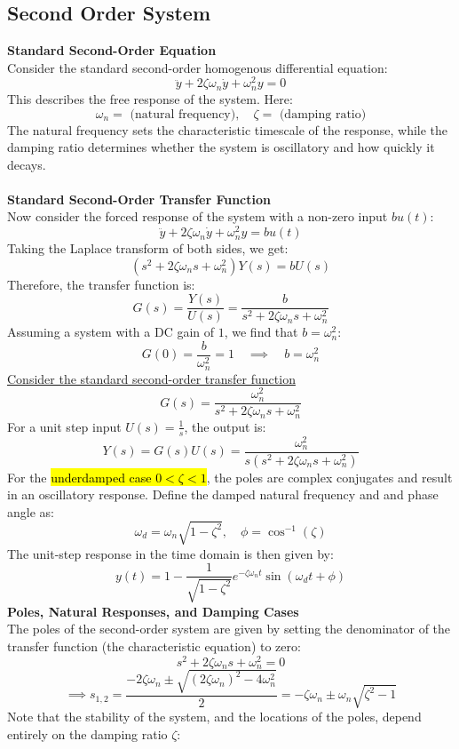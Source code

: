 ﻿\documentclass[12pt]{article}
\begin{document}
\subsection*{Second Order System}
\textbf{Standard Second-Order Equation}\\
Consider the standard second-order homogenous differential equation:
\[\ddot{y} + 2\zeta\omega_n\dot{y} + \omega_n^2 y = 0\]
This describes the free response of the system. Here:
\[\omega_n = \text{ (natural frequency)},\quad \zeta = \text{ (damping ratio)}\]
The natural frequency sets the characteristic timescale of the response, while the damping ratio determines whether the system is oscillatory and how quickly it decays.\\\\
\textbf{Standard Second-Order Transfer Function}\\
Now consider the forced response of the system with a non-zero input $b u(t)$:
\[\ddot{y} + 2\zeta\omega_n\dot{y} + \omega_n^2 y = b u(t)\]
Taking the Laplace transform of both sides, we get:
\[\left(s^2 + 2\zeta\omega_n s + \omega_n^2\right) Y(s) = b U(s)\]
Therefore, the transfer function is:
\[G(s) = \frac{Y(s)}{U(s)} = \frac{b}{s^2 + 2\zeta\omega_n s + \omega_n^2}\]
Assuming a system with a DC gain of $1$, we find that $b = \omega_n^2$:
\[G(0) = \frac{b}{\omega_n^2} = 1 \quad \implies \quad b = \omega_n^2\]
\underline{Consider the standard second-order transfer function}
\[\boxed{G(s) = \frac{\omega_n^2}{s^2 + 2\zeta\omega_n s + \omega_n^2}}\]
For a unit step input $U(s) = \frac{1}{s}$, the output is:
\[Y(s) = G(s)U(s) = \frac{\omega_n^2}{s(s^2 + 2\zeta\omega_n s + \omega_n^2)}\]
For the \hl{underdamped case $0 < \zeta < 1$}, the poles are complex conjugates and result in an oscillatory response. Define the damped natural frequency and and phase angle as:
\[\boxed{\omega_d = \omega_n\sqrt{1 - \zeta^2}, \quad \phi = \cos^{-1}(\zeta)}\]
The unit-step response in the time domain is then given by:
\[y(t) = 1 - \frac{1}{\sqrt{1-\zeta^2}} e^{-\zeta\omega_n t} \sin(\omega_d t + \phi)\]
\textbf{Poles, Natural Responses, and Damping Cases}\\
The poles of the second-order system are given by setting the denominator of the transfer function (the characteristic equation) to zero:
\[s^2 + 2\zeta\omega_n s + \omega_n^2 = 0\]
\[\implies s_{1,2} = \frac{-2\zeta \omega_n \pm \sqrt{(2\zeta \omega_n)^2 - 4 \omega_n^2}}{2} = -\zeta \omega_n \pm \omega_n \sqrt{\zeta^2 -1}\]
Note that the stability of the system, and the locations of the poles, depend entirely on the damping ratio $\zeta$:
\end{document}
